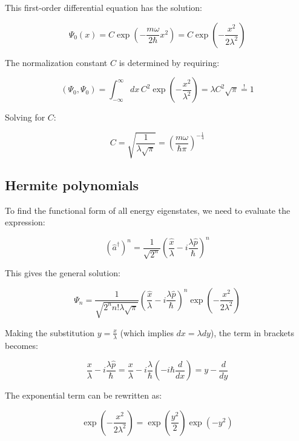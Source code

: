 \documentclass[italian]{HKNdocument}
\begin{document}
This first-order differential equation has the solution:

\begin{equation}
\Psi_0(x) = C\exp\left(-\frac{m\omega}{2\hbar}x^2\right) = C\exp\left(-\frac{x^2}{2\lambda^2}\right)
\end{equation}

The normalization constant $C$ is determined by requiring:

\begin{equation}
(\Psi_0, \Psi_0) = \int_{-\infty}^{\infty}dx\,C^2\exp\left(-\frac{x^2}{\lambda^2}\right) = \lambda C^2\sqrt{\pi} \stackrel{!}{=} 1
\end{equation}

Solving for $C$:

\begin{equation}
C = \sqrt{\frac{1}{\lambda\sqrt{\pi}}} = \left(\frac{m\omega}{\hbar\pi}\right)^{-\frac{1}{4}}
\end{equation}

\subsection{Hermite polynomials}

To find the functional form of all energy eigenstates, we need to evaluate the expression:

\begin{equation}
(\hat{a}^\dagger)^n = \frac{1}{\sqrt{2^n}}\left(\frac{\hat{x}}{\lambda} - i\frac{\lambda\hat{p}}{\hbar}\right)^n
\end{equation}

This gives the general solution:

\begin{equation}
\Psi_n = \frac{1}{\sqrt{2^n n!\lambda\sqrt{\pi}}}\left(\frac{\hat{x}}{\lambda} - i\frac{\lambda\hat{p}}{\hbar}\right)^n\exp\left(-\frac{x^2}{2\lambda^2}\right)
\end{equation}

Making the substitution $y = \frac{x}{\lambda}$ (which implies $dx = \lambda dy$), the term in brackets becomes:

\begin{equation}
\frac{x}{\lambda} - i\frac{\lambda\hat{p}}{\hbar} = \frac{x}{\lambda} - i\frac{\lambda}{\hbar}\left(-i\hbar\frac{d}{dx}\right) = y - \frac{d}{dy}
\end{equation}

The exponential term can be rewritten as:

\begin{equation}
\exp\left(-\frac{x^2}{2\lambda^2}\right) = \exp\left(\frac{y^2}{2}\right)\exp(-y^2)
\end{equation}
\end{document}
